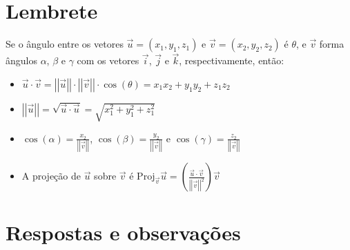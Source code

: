 \documentclass[12pt,a4paper]{article}
\newcommand{\norm}[1]{\left|\left|{#1}\right|\right|}
\begin{document}
\section*{Lembrete}
Se o ângulo entre os vetores $\vec{u} = (x_1, y_1, z_1)$ e $\vec{v} = (x_2, y_2, z_2)$ é $\theta$, e $\vec{v}$ forma ângulos $\alpha$, $\beta$ e $\gamma$ com os vetores $\vec{i}$, $\vec{j}$ e $\vec{k}$, respectivamente, então:
\begin{itemize}
\item $\vec{u} \cdot \vec{v} = \norm{\vec{u}} \cdot \norm{\vec{v}} \cdot \cos(\theta) = x_1x_2 + y_1y_2 + z_1z_2$
\item $\norm{\vec{u}} = \sqrt{\vec{u} \cdot \vec{u}} = \sqrt{x_1^2 + y_1^2 + z_1^2}$
\item $\cos(\alpha) = \frac{x_2}{\norm{\vec{v}}}$, $\cos(\beta) = \frac{y_2}{\norm{\vec{v}}}$ e $\cos(\gamma) = \frac{z_2}{\norm{\vec{v}}}$
\item A projeção de $\vec{u}$ sobre $\vec{v}$ é $\text{Proj}_{\vec{v}}\vec{u} = \left( \frac{\vec{u} \cdot \vec{v}}{ \norm{ \vec{v} }^2} \right) \vec{v} $
\end{itemize}



\newpage
\restoregeometry
\section*{Respostas e observações}
\end{document}
